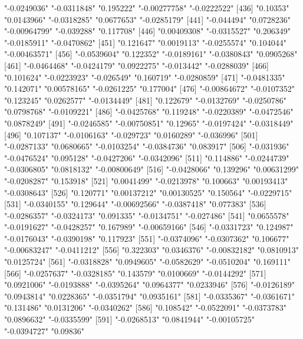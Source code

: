 \begin{Schunk}
\begin{Soutput}
[431] "-0.0249036"   "-0.0311848"   "0.195222"     "-0.00277758"  "-0.0222522"  
[436] "0.10353"      "0.0143966"    "-0.0318285"   "0.0677653"    "-0.0285179"  
[441] "-0.044494"    "0.0728236"    "-0.00964799"  "-0.039288"    "0.117708"    
[446] "0.00409308"   "-0.0315527"   "0.206349"     "-0.0185911"   "-0.0470862"  
[451] "0.121647"     "0.0019113"    "-0.0255574"   "0.104044"     "-0.00463571" 
[456] "-0.0539604"   "0.122352"     "-0.0189161"   "-0.0380843"   "0.0905268"   
[461] "-0.0464468"   "-0.0424179"   "0.0922275"    "-0.013442"    "-0.0288039"  
[466] "0.101624"     "-0.0223923"   "-0.026549"    "0.160719"     "-0.0280859"  
[471] "-0.0481335"   "0.142071"     "0.00578165"   "-0.0261225"   "0.177004"    
[476] "-0.00864672"  "-0.0107352"   "0.123245"     "0.0262577"    "-0.0134449"  
[481] "0.122679"     "-0.0132769"   "-0.0250786"   "0.0798768"    "-0.0109221"  
[486] "-0.0425768"   "0.119248"     "-0.0220389"   "-0.0472546"   "0.0878249"   
[491] "-0.0246585"   "-0.00750851"  "0.12965"      "-0.0197424"   "-0.0318449"  
[496] "0.107137"     "-0.0106163"   "-0.029723"    "0.0160289"    "-0.036996"   
[501] "-0.0287133"   "0.0680665"    "-0.0103254"   "-0.0384736"   "0.083917"    
[506] "-0.031936"    "-0.0476524"   "0.095128"     "-0.0427206"   "-0.0342096"  
[511] "0.114886"     "-0.0244739"   "-0.0306805"   "0.0818132"    "-0.00800649" 
[516] "-0.0428066"   "0.139296"     "0.00631299"   "-0.0208287"   "0.153918"    
[521] "0.0041499"    "-0.0213978"   "0.100663"     "0.00193413"   "-0.0308643"  
[526] "0.120771"     "0.00137212"   "0.00130525"   "0.150564"     "-0.0229715"  
[531] "-0.0340155"   "0.129644"     "-0.00692566"  "-0.0387418"   "0.077383"    
[536] "-0.0286357"   "-0.0324173"   "0.091335"     "-0.0134751"   "-0.027486"   
[541] "0.0655578"    "-0.0191627"   "-0.0428257"   "0.167989"     "-0.00659166" 
[546] "-0.0331723"   "0.124987"     "-0.0176043"   "-0.0390198"   "0.117923"    
[551] "-0.0374096"   "-0.0307362"   "0.106677"     "-0.00683247"  "-0.0411212"  
[556] "0.322303"     "0.0346376"    "-0.00832182"  "0.0810913"    "0.0125724"   
[561] "-0.0318828"   "0.0949605"    "-0.0582629"   "-0.0510204"   "0.169111"    
[566] "-0.0257637"   "-0.0328185"   "0.143579"     "0.0100669"    "-0.0144292"  
[571] "0.0921006"    "-0.0193888"   "-0.0395264"   "0.0964377"    "0.0233946"   
[576] "-0.0126189"   "0.0943814"    "0.0228365"    "-0.0351794"   "0.0935161"   
[581] "-0.0335367"   "-0.0361671"   "0.131486"     "0.0131206"    "-0.0340262"  
[586] "0.108542"     "-0.0522091"   "-0.0373783"   "0.0896632"    "-0.0335599"  
[591] "-0.0268513"   "0.0841944"    "-0.00105725"  "-0.0394727"   "0.09836"     

\end{Soutput}
\end{Schunk}
